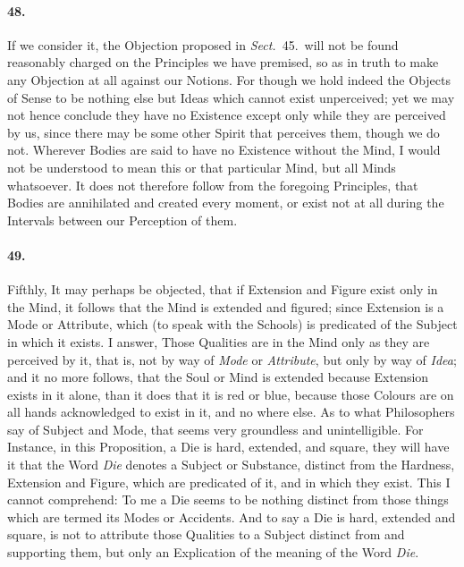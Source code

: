 \documentclass[]{article}
\newenvironment{sectionbody}{\begin{multicols}{2}}{\end{multicols}}
\begin{document}
\begin{sectionbody}
\paragraph{48.} If we consider it, the Objection proposed in
\emph{Sect.}~45.\ will not be found reasonably charged on the
Principles we have
premised, so as in truth to make any Objection at all against our
Notions.  For though we hold indeed the Objects of Sense to be
nothing else but Ideas which cannot exist unperceived; yet we may
not hence conclude they have no Existence except only while they
are perceived by us, since there may be some other Spirit that
perceives them, though we do not.  Wherever Bodies are said to
have no Existence without the Mind, I would not be understood to
mean this or that particular Mind, but all Minds whatsoever.  It
does not therefore follow from the foregoing Principles, that
Bodies are annihilated and created every moment, or exist not at
all during the Intervals between our Perception of them.



\paragraph{49.} Fifthly, It may perhaps be objected, that if Extension and Figure
exist only in the Mind, it follows that the Mind is extended and
figured; since Extension is a Mode or Attribute, which (to speak
with the Schools) is predicated of the Subject in which it
exists.  I answer, Those Qualities are in the Mind only as they
are perceived by it, that is, not by way of \emph{Mode} or
\emph{Attribute}, but only by way of \emph{Idea}; and it no
more follows, that the Soul or Mind is extended because Extension
exists in it alone, than it does that it is red or blue, because
those Colours are on all hands acknowledged to exist in it, and
no where else.  As to what Philosophers say of Subject and Mode,
that seems very groundless and unintelligible.  For Instance, in
this Proposition, a Die is hard, extended, and square, they will
have it that the Word \emph{Die} denotes a Subject or
Substance, distinct from the Hardness, Extension and Figure,
which are predicated of it, and in which they exist.  This I
cannot comprehend: To me a Die seems to be nothing distinct from
those things which are termed its Modes or Accidents.  And to
say a Die is hard, extended and square, is not to attribute those
Qualities to a Subject distinct from and supporting them, but
only an Explication of the meaning of the Word \emph{Die}.




\end{sectionbody}
\end{document}
